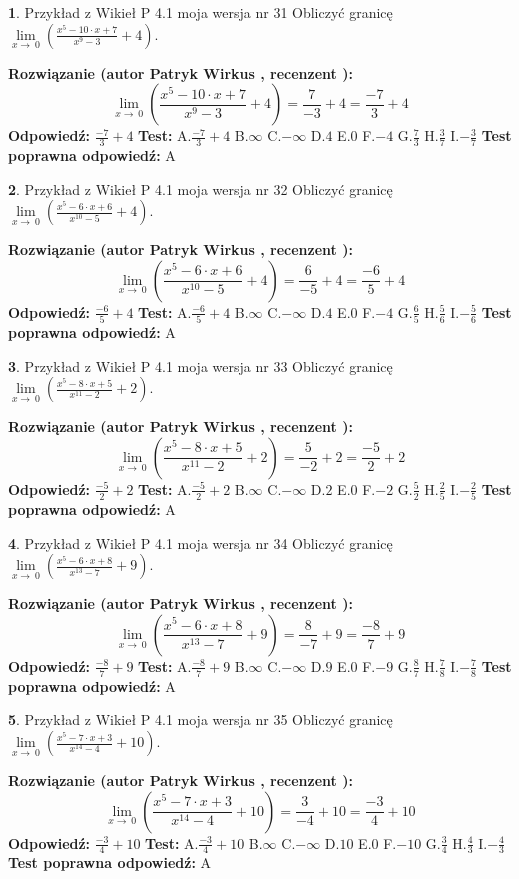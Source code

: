 \documentclass[12pt, a4paper]{article}
\theoremstyle{definition} %
\newtheorem{zad}{}
\newcommand{\zadStart}[1]{\begin{zad}#1\newline}
\newcommand{\zadStop}{\end{zad}}
\newcommand{\rozwStart}[2]{\noindent \textbf{Rozwiązanie (autor #1 , recenzent #2): }\newline}
\newcommand{\rozwStop}{\newline}
\newcommand{\odpStart}{\noindent \textbf{Odpowiedź:}\newline}
\newcommand{\odpStop}{\newline}
\newcommand{\testStart}{\noindent \textbf{Test:}\newline}
\newcommand{\testStop}{\newline}
\newcommand{\kluczStart}{\noindent \textbf{Test poprawna odpowiedź:}\newline}
\newcommand{\kluczStop}{\newline}
\begin{document}
\zadStart{Przykład z Wikieł P 4.1 moja wersja nr 31}
Obliczyć granicę $\lim\limits_{x\to\ 0}(\frac{x^{5}-10 \cdot x +7}{x^{9}-3}+4)$.
\zadStop
\rozwStart{Patryk Wirkus}{}
$$\lim\limits_{x\to\ 0}(\frac{x^{5}-10 \cdot x +7}{x^{9}-3}+4)=\frac{7}{-3}+4=\frac{-7}{3}+4$$
\rozwStop
\odpStart
$\frac{-7}{3}+4$
\odpStop
\testStart
A.$\frac{-7}{3}+4$
B.$\infty$
C.$-\infty$
D.$4$
E.$0$
F.$-4$
G.$\frac{7}{3}$
H.$\frac{3}{7}$
I.$-\frac{3}{7}$
\testStop
\kluczStart
A
\kluczStop



\zadStart{Przykład z Wikieł P 4.1 moja wersja nr 32}
Obliczyć granicę $\lim\limits_{x\to\ 0}(\frac{x^{5}-6 \cdot x +6}{x^{10}-5}+4)$.
\zadStop
\rozwStart{Patryk Wirkus}{}
$$\lim\limits_{x\to\ 0}(\frac{x^{5}-6 \cdot x +6}{x^{10}-5}+4)=\frac{6}{-5}+4=\frac{-6}{5}+4$$
\rozwStop
\odpStart
$\frac{-6}{5}+4$
\odpStop
\testStart
A.$\frac{-6}{5}+4$
B.$\infty$
C.$-\infty$
D.$4$
E.$0$
F.$-4$
G.$\frac{6}{5}$
H.$\frac{5}{6}$
I.$-\frac{5}{6}$
\testStop
\kluczStart
A
\kluczStop



\zadStart{Przykład z Wikieł P 4.1 moja wersja nr 33}
Obliczyć granicę $\lim\limits_{x\to\ 0}(\frac{x^{5}-8 \cdot x +5}{x^{11}-2}+2)$.
\zadStop
\rozwStart{Patryk Wirkus}{}
$$\lim\limits_{x\to\ 0}(\frac{x^{5}-8 \cdot x +5}{x^{11}-2}+2)=\frac{5}{-2}+2=\frac{-5}{2}+2$$
\rozwStop
\odpStart
$\frac{-5}{2}+2$
\odpStop
\testStart
A.$\frac{-5}{2}+2$
B.$\infty$
C.$-\infty$
D.$2$
E.$0$
F.$-2$
G.$\frac{5}{2}$
H.$\frac{2}{5}$
I.$-\frac{2}{5}$
\testStop
\kluczStart
A
\kluczStop



\zadStart{Przykład z Wikieł P 4.1 moja wersja nr 34}
Obliczyć granicę $\lim\limits_{x\to\ 0}(\frac{x^{5}-6 \cdot x +8}{x^{13}-7}+9)$.
\zadStop
\rozwStart{Patryk Wirkus}{}
$$\lim\limits_{x\to\ 0}(\frac{x^{5}-6 \cdot x +8}{x^{13}-7}+9)=\frac{8}{-7}+9=\frac{-8}{7}+9$$
\rozwStop
\odpStart
$\frac{-8}{7}+9$
\odpStop
\testStart
A.$\frac{-8}{7}+9$
B.$\infty$
C.$-\infty$
D.$9$
E.$0$
F.$-9$
G.$\frac{8}{7}$
H.$\frac{7}{8}$
I.$-\frac{7}{8}$
\testStop
\kluczStart
A
\kluczStop



\zadStart{Przykład z Wikieł P 4.1 moja wersja nr 35}
Obliczyć granicę $\lim\limits_{x\to\ 0}(\frac{x^{5}-7 \cdot x +3}{x^{14}-4}+10)$.
\zadStop
\rozwStart{Patryk Wirkus}{}
$$\lim\limits_{x\to\ 0}(\frac{x^{5}-7 \cdot x +3}{x^{14}-4}+10)=\frac{3}{-4}+10=\frac{-3}{4}+10$$
\rozwStop
\odpStart
$\frac{-3}{4}+10$
\odpStop
\testStart
A.$\frac{-3}{4}+10$
B.$\infty$
C.$-\infty$
D.$10$
E.$0$
F.$-10$
G.$\frac{3}{4}$
H.$\frac{4}{3}$
I.$-\frac{4}{3}$
\testStop
\kluczStart
A
\kluczStop
\end{document}
